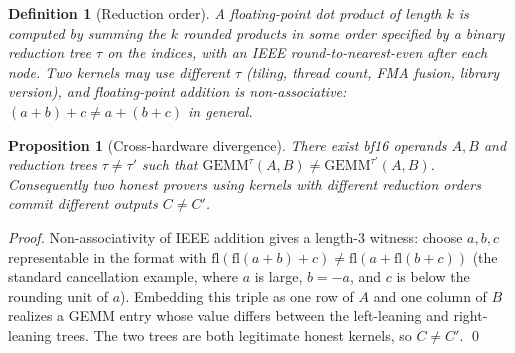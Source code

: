 \documentclass[11pt]{article}
\newtheorem{proposition}[theorem]{Proposition}
\newtheorem{definition}{Definition}
\newcommand{\GEMM}{\mathrm{GEMM}}
\begin{document}
\begin{definition}[Reduction order]
A floating-point dot product of length $k$ is computed by summing the $k$ rounded products in
some order specified by a binary \emph{reduction tree} $\tau$ on the indices, with an IEEE
round-to-nearest-even after each node. Two kernels may use different $\tau$ (tiling, thread
count, FMA fusion, library version), and floating-point addition is non-associative:
$(a+b)+c \ne a+(b+c)$ in general.
\end{definition}

\begin{proposition}[Cross-hardware divergence]
\label{prop:divergence}
There exist bf16 operands $A,B$ and reduction trees $\tau \ne \tau'$ such that
$\GEMM^{\tau}(A,B) \ne \GEMM^{\tau'}(A,B)$. Consequently two honest provers using kernels with
different reduction orders commit different outputs $C \ne C'$.
\end{proposition}

\begin{proof}
Non-associativity of IEEE addition gives a length-$3$ witness: choose $a,b,c$ representable in
the format with $\mathrm{fl}(\mathrm{fl}(a+b)+c) \ne \mathrm{fl}(a+\mathrm{fl}(b+c))$ (the
standard cancellation example, where $a$ is large, $b = -a$, and $c$ is below the rounding
unit of $a$). Embedding this triple as one row of $A$ and one column of $B$ realizes a GEMM
entry whose value differs between the left-leaning and right-leaning trees. The two trees are
both legitimate honest kernels, so $C \ne C'$. \qed
\end{proof}
\end{document}
